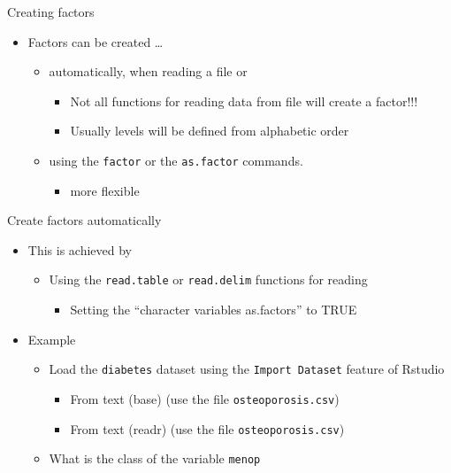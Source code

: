 \documentclass[
  ignorenonframetext,
]{beamer}
\providecommand{\tightlist}{%
  \setlength{\itemsep}{0pt}\setlength{\parskip}{0pt}}
\begin{document}
\begin{frame}[fragile]{Creating factors}
\protect\hypertarget{creating-factors}{}
\begin{itemize}
\item
  Factors can be created \ldots{}

  \begin{itemize}
  \item
    automatically, when reading a file or

    \begin{itemize}
    \tightlist
    \item
      Not all functions for reading data from file will create a
      factor!!!
    \item
      Usually levels will be defined from alphabetic order
    \end{itemize}
  \item
    using the \texttt{factor} or the \texttt{as.factor} commands.

    \begin{itemize}
    \tightlist
    \item
      more flexible
    \end{itemize}
  \end{itemize}
\end{itemize}
\end{frame}

\begin{frame}[fragile]{Create factors automatically}
\protect\hypertarget{create-factors-automatically}{}
\begin{itemize}
\item
  This is achieved by

  \begin{itemize}
  \item
    Using the \texttt{read.table} or \texttt{read.delim} functions for
    reading

    \begin{itemize}
    \tightlist
    \item
      Setting the ``character variables as.factors'' to TRUE
    \end{itemize}
  \end{itemize}
\item
  Example

  \begin{itemize}
  \tightlist
  \item
    Load the \texttt{diabetes} dataset using the
    \texttt{Import\ Dataset} feature of Rstudio

    \begin{itemize}
    \tightlist
    \item
      From text (base) (use the file \texttt{osteoporosis.csv})
    \item
      From text (readr) (use the file \texttt{osteoporosis.csv})
    \end{itemize}
  \item
    What is the class of the variable \texttt{menop}
  \end{itemize}
\end{itemize}
\end{frame}
\end{document}
